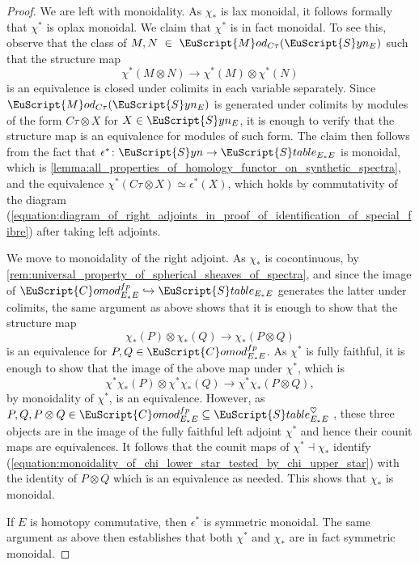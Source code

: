 \documentclass[oneside,a4paper]{amsart}
\newcommand{\euscr}[1]{\EuScript{#1}} %
\newcommand{\stableE}{\euscr{S}table_{E_{*}E}} %
\newcommand{\synspectra}{\euscr{S}yn} %
\newcommand{\Comod}{\euscr{C}omod} %
\newcommand{\ComodE}{\Comod_{E_{*}E}} %
\newcommand{\Mod}{\euscr{M}od} %
\theoremstyle{plain}
\theoremstyle{definition}
\theoremstyle{remark}
\begin{document}
\begin{proof}
We are left with monoidality. As $\chi_{*}$ is lax monoidal, it follows formally that $\chi^{*}$ is oplax monoidal. We claim that $\chi^{*}$ is in fact monoidal. To see this, observe that the class of $M, N~\in~\Mod_{C\tau}(\synspectra_{E})$ such that the structure map 
\[
\chi^{*}(M \otimes N) \rightarrow \chi^{*}(M) \otimes \chi^{*}(N) 
\]
is an equivalence is closed under colimits in each variable separately. Since $\Mod_{C\tau}(\synspectra_{E})$ is generated under colimits by modules of the form $C\tau \otimes X$ for $X \in \synspectra_{E}$, it is enough to verify that the structure map is an equivalence for modules of such form. The claim then follows from the fact that $\epsilon^{*} \colon \synspectra \rightarrow \stableE$ is monoidal, which is \cref{lemma:all_properties_of_homology_functor_on_synthetic_spectra}, and the equivalence $\chi^{*}(C\tau \otimes X) \simeq \epsilon^{*}(X)$, which holds by commutativity of the diagram (\ref{equation:diagram_of_right_adjoints_in_proof_of_identification_of_special_fibre}) after taking left adjoints. 

We move to monoidality of the right adjoint. As $\chi_{*}$ is cocontinuous, by  \cref{rem:universal_property_of_spherical_sheaves_of_spectra}, and since the image of $\ComodE^{fp} \hookrightarrow \stableE$ generates the latter under colimits, the same argument as above shows that it is enough to show that the structure map 
\[
\chi_{*}(P) \otimes \chi_{*}(Q) \rightarrow \chi_{*}(P \otimes Q) 
\]
is an equivalence for $P, Q \in \ComodE^{fp}$. As $\chi^{*}$ is fully faithful, it is enough to show that the image of the above map under $\chi^{*}$, which is 
\begin{equation}
\label{equation:monoidality_of_chi_lower_star_tested_by_chi_upper_star}
\chi^{*} \chi_{*}(P) \otimes \chi^{*} \chi_{*}(Q) \rightarrow \chi^{*} \chi_{*}(P \otimes Q),
\end{equation}
by monoidality of $\chi^{*}$, is an equivalence. However, as $P, Q, P \otimes Q \in \ComodE^{fp} \subseteq \stableE^{\heartsuit}$ , these three objects are in the image of the fully faithful left adjoint $\chi^{*}$ and hence their counit maps are equivalences. It follows that the counit maps of $\chi^{*} \dashv \chi_{*}$ identify (\ref{equation:monoidality_of_chi_lower_star_tested_by_chi_upper_star}) with the identity of $P \otimes Q$ which is an equivalence as needed. This shows that $\chi_{*}$ is monoidal. 

If $E$ is homotopy commutative, then $\epsilon^{*}$ is symmetric monoidal. The same argument as above then establishes that both $\chi^{*}$ and $\chi_{*}$ are in fact symmetric monoidal. 
\end{proof}
\end{document}
